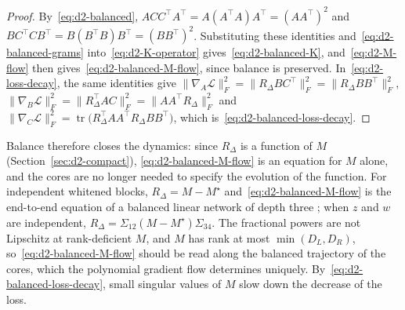 \documentclass[11pt]{article}
\newcommand{\norm}[1]{\lVert #1\rVert}
\theoremstyle{definition}
\numberwithin{equation}{section}
\begin{document}
\begin{proof}
By~\eqref{eq:d2-balanced}, $ACC^\top A^\top=A(A^\top A)A^\top=(AA^\top)^2$ and $BC^\top CB^\top=B(B^\top B)B^\top=(BB^\top)^2$. Substituting these identities and~\eqref{eq:d2-balanced-grams} into~\eqref{eq:d2-K-operator} gives~\eqref{eq:d2-balanced-K}, and~\eqref{eq:d2-M-flow} then gives~\eqref{eq:d2-balanced-M-flow}, since balance is preserved. In~\eqref{eq:d2-loss-decay}, the same identities give $\norm{\nabla_A\mathcal L}_F^2=\norm{R_\Delta BC^\top}_F^2=\norm{R_\Delta BB^\top}_F^2$, $\norm{\nabla_B\mathcal L}_F^2=\norm{R_\Delta^\top AC}_F^2=\norm{AA^\top R_\Delta}_F^2$ and $\norm{\nabla_C\mathcal L}_F^2=\operatorname{tr}\big(R_\Delta^\top AA^\top R_\Delta BB^\top\big)$, which is~\eqref{eq:d2-balanced-loss-decay}.
\end{proof}

Balance therefore closes the dynamics: since $R_\Delta$ is a function of $M$ (Section~\ref{sec:d2-compact}), \eqref{eq:d2-balanced-M-flow} is an equation for $M$ alone, and the cores are no longer needed to specify the evolution of the function. For independent whitened blocks, $R_\Delta=M-M^\star$ and~\eqref{eq:d2-balanced-M-flow} is the end-to-end equation of a balanced linear network of depth three \citep{arora2018optimization}; when $z$ and $w$ are independent, $R_\Delta=\Sigma_{12}(M-M^\star)\Sigma_{34}$. The fractional powers are not Lipschitz at rank-deficient $M$, and $M$ has rank at most $\min(D_L,D_R)$, so~\eqref{eq:d2-balanced-M-flow} should be read along the balanced trajectory of the cores, which the polynomial gradient flow determines uniquely. By~\eqref{eq:d2-balanced-loss-decay}, small singular values of $M$ slow down the decrease of the loss.
\end{document}
